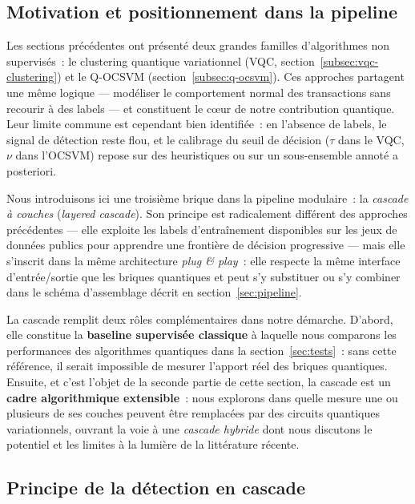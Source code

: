 \documentclass[a4paper]{article}
\begin{document}
\subsection{Motivation et positionnement dans la pipeline}
 
Les sections précédentes ont présenté deux grandes familles d'algorithmes non supervisés~: le clustering quantique variationnel (VQC, section~\ref{subsec:vqc-clustering}) et le Q-OCSVM (section~\ref{subsec:q-ocsvm}). Ces approches partagent une même logique --- modéliser le comportement normal des transactions sans recourir à des labels --- et constituent le c\oe ur de notre contribution quantique. Leur limite commune est cependant bien identifiée~: en l'absence de labels, le signal de détection reste flou, et le calibrage du seuil de décision ($\tau$ dans le VQC, $\nu$ dans l'OCSVM) repose sur des heuristiques ou sur un sous-ensemble annoté a posteriori.
 
Nous introduisons ici une troisième brique dans la pipeline modulaire~: la \emph{cascade à couches} (\textit{layered cascade}). Son principe est radicalement différent des approches précédentes --- elle exploite les labels d'entraînement disponibles sur les jeux de données publics pour apprendre une frontière de décision progressive --- mais elle s'inscrit dans la même architecture \textit{plug \& play}~: elle respecte la même interface d'entrée/sortie que les briques quantiques et peut s'y substituer ou s'y combiner dans le schéma d'assemblage décrit en section~\ref{sec:pipeline}.
 
La cascade remplit deux rôles complémentaires dans notre démarche. D'abord, elle constitue la \textbf{baseline supervisée classique} à laquelle nous comparons les performances des algorithmes quantiques dans la section~\ref{sec:tests}~: sans cette référence, il serait impossible de mesurer l'apport réel des briques quantiques. Ensuite, et c'est l'objet de la seconde partie de cette section, la cascade est un \textbf{cadre algorithmique extensible}~: nous explorons dans quelle mesure une ou plusieurs de ses couches peuvent être remplacées par des circuits quantiques variationnels, ouvrant la voie à une \emph{cascade hybride} dont nous discutons le potentiel et les limites à la lumière de la littérature récente.
 
\subsection{Principe de la détection en cascade}
 
\end{document}
